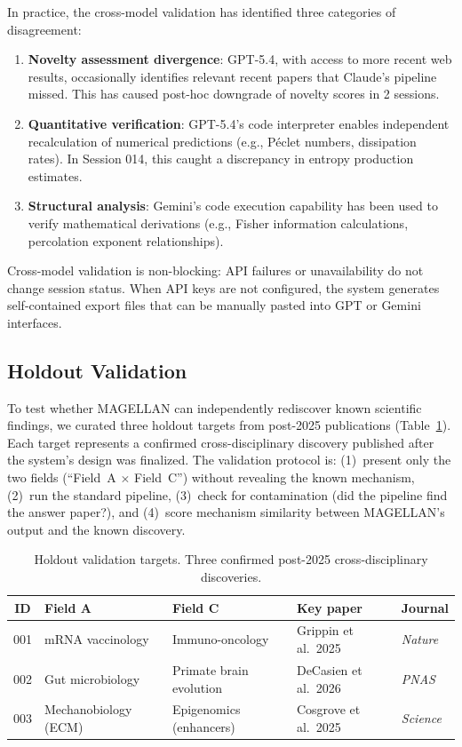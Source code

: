 In practice, the cross-model validation has identified three categories of disagreement:
\begin{enumerate}
    \item \textbf{Novelty assessment divergence}: GPT-5.4, with access to more recent web results, occasionally identifies relevant recent papers that Claude's pipeline missed. This has caused post-hoc downgrade of novelty scores in 2 sessions.
    \item \textbf{Quantitative verification}: GPT-5.4's code interpreter enables independent recalculation of numerical predictions (e.g., P\'{e}clet numbers, dissipation rates). In Session 014, this caught a discrepancy in entropy production estimates.
    \item \textbf{Structural analysis}: Gemini's code execution capability has been used to verify mathematical derivations (e.g., Fisher information calculations, percolation exponent relationships).
\end{enumerate}

Cross-model validation is non-blocking: API failures or unavailability do not change session status. When API keys are not configured, the system generates self-contained export files that can be manually pasted into GPT or Gemini interfaces.

\subsection{Holdout Validation}
\label{sec:holdout}

To test whether MAGELLAN can independently rediscover known scientific findings, we curated three holdout targets from post-2025 publications (Table~\ref{tab:holdouts}). Each target represents a confirmed cross-disciplinary discovery published after the system's design was finalized. The validation protocol is: (1)~present only the two fields (``Field~A $\times$ Field~C'') without revealing the known mechanism, (2)~run the standard pipeline, (3)~check for contamination (did the pipeline find the answer paper?), and (4)~score mechanism similarity between MAGELLAN's output and the known discovery.

\begin{table}[htbp]
\centering
\caption{Holdout validation targets. Three confirmed post-2025 cross-disciplinary discoveries.}
\label{tab:holdouts}
\small
\begin{tabular}{@{}cp{3cm}p{3cm}ll@{}}
\toprule
\textbf{ID} & \textbf{Field A} & \textbf{Field C} & \textbf{Key paper} & \textbf{Journal} \\
\midrule
001 & mRNA vaccinology & Immuno-oncology & Grippin et al.\ 2025 & \textit{Nature} \\
002 & Gut microbiology & Primate brain evolution & DeCasien et al.\ 2026 & \textit{PNAS} \\
003 & Mechanobiology (ECM) & Epigenomics (enhancers) & Cosgrove et al.\ 2025 & \textit{Science} \\
\bottomrule
\end{tabular}
\end{table}

